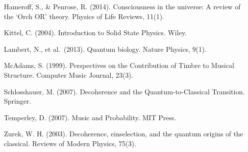 \documentclass{gs-adonis}
\begin{document}
Hameroff, S., \& Penrose, R. (2014). Consciousness in the universe: A
review of the `Orch OR' theory. Physics of Life Reviews, 11(1).

Kittel, C. (2004). Introduction to Solid State Physics. Wiley.

Lambert, N., et al.~(2013). Quantum biology. Nature Physics, 9(1).

McAdams, S. (1999). Perspectives on the Contribution of Timbre to
Musical Structure. Computer Music Journal, 23(3).

Schlosshauer, M. (2007). Decoherence and the Quantum-to-Classical
Transition. Springer.

Temperley, D. (2007). Music and Probability. MIT Press.

Zurek, W. H. (2003). Decoherence, einselection, and the quantum origins
of the classical. Reviews of Modern Physics, 75(3).

\end{document}
